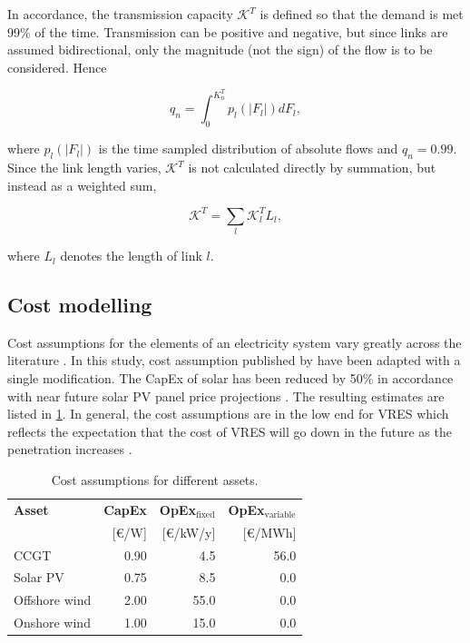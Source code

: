 \documentclass[a4paper, 5p, sort&compress]{elsarticle}%
\begin{document}
In accordance, the transmission capacity $\mathcal{K}^{T}$ is defined
so that the demand is met 99\% of the time. Transmission can be
positive and negative, but since links are assumed bidirectional, only
the magnitude (not the sign) of the flow is to be considered. Hence

\begin{equation}
  \label{eq:2}
  q_{n} = \int _{0} ^{K_{n}^{T}} p_{l}(|F_{l}|)dF_{l},
\end{equation}

where $p_{l}(|F_{l}|)$ is the time sampled distribution of absolute
flows and $q_{n} = 0.99$. Since the link length varies,
$\mathcal{K}^{T}$ is not calculated directly by summation, but instead
as a weighted sum,

\begin{equation}
  \label{eq:4}
  \mathcal{K}^{T} = \sum_{l} \mathcal{K}^{T}_{l} L_{l},
\end{equation}

where $L_{l}$ denotes the length of link $l$.


\subsection{Cost modelling}
\label{sec:cost-modelling}

Cost assumptions for the elements of an electricity system vary
greatly across the literature \cite{Sensitivity}. In this study, cost
assumption published by \cite{Rolando} have been adapted with a single
modification. The CapEx of solar has been reduced by 50\% in accordance
with near future solar PV panel price projections \cite{irena}. The
resulting estimates are listed in \cref{tab:cost-assumptions}. In
general, the cost assumptions are in the low end for VRES which
reflects the expectation that the cost of VRES will go down in the
future as the penetration increases \cite{Fraunhofer}.

\begin{table}[h!]
  \centering
  \caption{Cost assumptions for different assets.}
  \label{tab:cost-assumptions}
  \begin{tabular}{lrrr}  \toprule
    \textbf{Asset} & \textbf{CapEx }& \textbf{OpEx$_{\text{fixed}}$} & \textbf{OpEx$_{\text{variable}}$}\\
    & [€/W] & [€/kW/y] & [€/MWh]\\ \midrule
    CCGT & 0.90 & 4.5 & 56.0\\
    Solar PV & 0.75 & 8.5 & 0.0\\
    Offshore wind & 2.00 & 55.0 & 0.0\\
    Onshore wind & 1.00 & 15.0 & 0.0\\
    \bottomrule
  \end{tabular}
\end{table}
\end{document}
